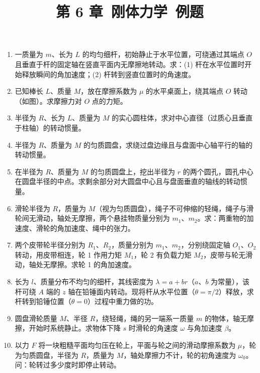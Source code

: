 \documentclass[12pt]{article}
\title{第 6 章\ 刚体力学\ 例题}
\author{}
\date{}
\begin{document}
\maketitle

\begin{enumerate}[label=\textbf{例\arabic*.}, leftmargin=*]

\item 一质量为 $m$、长为 $L$ 的均匀细杆，初始静止于水平位置，可绕通过其端点 $O$ 且垂直于杆的固定轴在竖直平面内无摩擦地转动。求：(1) 杆在水平位置时开始释放瞬间的角加速度；(2) 杆转到竖直位置时的角速度。

\item 已知棒长 $L$、质量 $M$，放在摩擦系数为 $\mu$ 的水平桌面上，绕其端点 $O$ 转动（如图）。求摩擦力对 $O$ 点的力矩。

\item 半径为 $R$、长为 $L$、质量为 $M$ 的实心圆柱体，求对中心直径（过质心且垂直于柱轴）的转动惯量。

\item 半径为 $R$、质量为 $M$ 的匀质圆盘，求绕过盘边缘且与盘面中心轴平行的轴的转动惯量。

\item 在半径为 $R$、质量为 $M$ 的匀质圆盘上，挖出半径为 $r$ 的两个圆孔，圆孔中心在圆盘半径的中点。求剩余部分对大圆盘中心且与盘面垂直的轴线的转动惯量。

\item 滑轮半径为 $R$，质量为 $M$（视为匀质圆盘），绳子不可伸缩的轻绳，绳子与滑轮间无滑动，轴处无摩擦，两个悬挂物质量分别为 $m_1$、$m_2$。求：两重物的加速度、滑轮的角加速度、绳中的张力。

\item 两个皮带轮半径分别为 $R_1$、$R_2$，质量分别为 $m_1$、$m_2$，分别绕固定轴 $O_1$、$O_2$ 转动，用皮带相连，轮 1 作用力矩 $M_1$，轮 2 有负载力矩 $M_2$，皮带与轮无滑动，轴处无摩擦。求轮 1 的角加速度。

\item 长为 $l$、质量分布不均匀的细杆，其线密度为 $\lambda = a + br$（$a$、$b$ 为常量），该杆可绕 $A$ 端的 $z$ 轴在铅锤面内转动。现将杆从水平位置（$\theta=\pi/2$）释放，求杆转到铅锤位置（$\theta=0$）过程中重力做的功。

\item 圆盘滑轮质量 $M$、半径 $R$，绕轻绳，绳的另一端系一质量 $m$ 的物体，轴无摩擦，开始时系统静止。求物体下降 $s$ 时滑轮的角速度 $\omega$ 与角加速度 $\beta$。

\item 以力 $F$ 将一块粗糙平面均匀压在轮上，平面与轮之间的滑动摩擦系数为 $\mu$，轮为匀质圆盘，半径为 $R$，质量为 $M$，轴处摩擦力不计，轮的初角速度为 $\omega_0$。问：轮转过多少度时即停止转动。


\end{enumerate}
\end{document}
